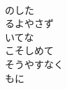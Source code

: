 \documentclass[10pt,b5j]{tarticle} %
\begin{document}
\begin{enumerate}
\begin{minipage}[c]{\blocksize}
        \vspace{\linespace}
        \item~\\
        のした\\
        るよやさず\\
        いてな\\
        こそしめて\\
        そうやすなく\\
        もに
    
    \end{minipage}
\end{enumerate} %
\end{document}
